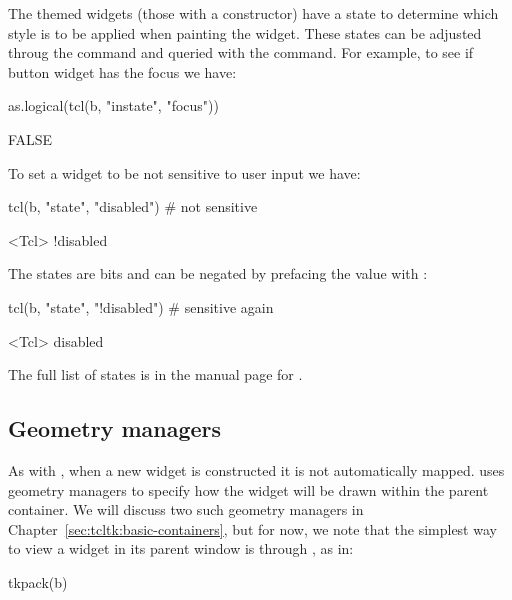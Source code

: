 The themed widgets (those with a  constructor) have a state
to determine which style is to be applied when painting the
widget. These states can be adjusted throug the  command
and queried with the  command. For example, to see if
button widget  has the focus we have:
\begin{Schunk}
\begin{Sinput}
 as.logical(tcl(b, "instate", "focus"))
\end{Sinput}
\begin{Soutput}
[1] FALSE
\end{Soutput}
\end{Schunk}
To set a widget to be not sensitive to user input we have:
\begin{Schunk}
\begin{Sinput}
 tcl(b, "state", "disabled")             # not sensitive
\end{Sinput}
\begin{Soutput}
<Tcl> !disabled 
\end{Soutput}
\end{Schunk}
The states are bits and can be negated by prefacing the value with \code{!}:
\begin{Schunk}
\begin{Sinput}
 tcl(b, "state", "!disabled")            # sensitive again
\end{Sinput}
\begin{Soutput}
<Tcl> disabled 
\end{Soutput}
\end{Schunk}

The full list of states is in the manual page for .

\subsection{Geometry managers}
\label{sec:tcltk:overview:geometry-managers}

As with \Qt, when a new widget is constructed it is not automatically
mapped. \TK\/ uses geometry managers to specify how the widget will be
drawn within the parent container. We will discuss two such geometry
managers in Chapter~\ref{sec:tcltk:basic-containers}, but for now, we note
that the simplest way to view a widget in its parent window is through
, as in:
\begin{Schunk}
\begin{Sinput}
 tkpack(b)
\end{Sinput}
\end{Schunk}

